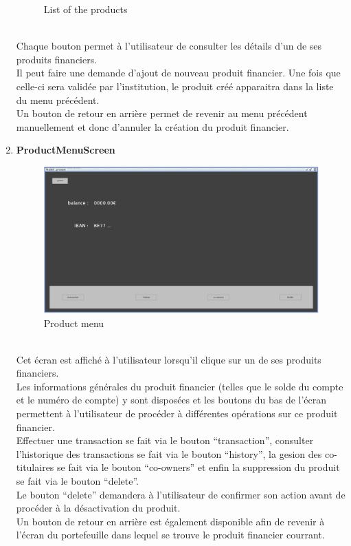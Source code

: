 \documentclass[../rapport.tex]{subfiles}
\begin{document}
\begin{enumerate}
\begin{figure}[h!]
				\caption{List of the products}
		\end{figure}
		\\
Chaque bouton permet à l'utilisateur de consulter les détails d'un de ses produits financiers.\\
Il peut faire une demande d'ajout de nouveau produit financier. Une fois que celle-ci sera validée par l'institution, le produit créé apparaitra dans la liste du menu précédent.\\
Un bouton de retour en arrière permet de revenir au menu précédent manuellement et donc d'annuler la création du produit financier.
\newpage
\item \textbf{ProductMenuScreen}\\
		\begin{figure}[h!]
				\centering \includegraphics[scale=0.2]{ressources/photos_diagrammes/app1/gui/productMenu.jpg}
				\caption{Product menu}
		\end{figure}
		\\
Cet écran est affiché à l'utilisateur lorsqu'il clique sur un de ses produits financiers. \\
Les informations générales du produit financier (telles que le solde du compte et le numéro de compte) y sont disposées et les boutons du bas de l'écran permettent à l'utilisateur de procéder à différentes opérations sur ce produit financier.\\
Effectuer une transaction se fait via le bouton ``transaction'', consulter l'historique des transactions se fait via le bouton ``history'',
la gesion des co-titulaires se fait via le bouton ``co-owners'' et enfin la suppression du produit se fait via le bouton ``delete''.\\
Le bouton ``delete'' demandera à l'utilisateur de confirmer son action avant de procéder à la désactivation du produit.\\
Un bouton de retour en arrière est également disponible afin de revenir à l'écran du portefeuille dans lequel se trouve le produit financier courrant.


\end{enumerate}
\end{document}

